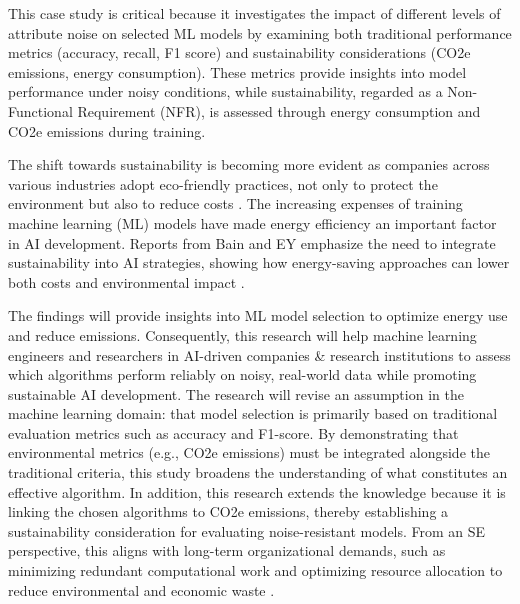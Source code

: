 \documentclass[conference]{IEEEtran}
\begin{document}
This case study is critical because it investigates the impact of different levels of attribute noise on selected ML models by examining both traditional performance metrics (accuracy, recall, F1 score) and sustainability considerations (CO2e emissions, energy consumption). These metrics provide insights into model performance under noisy conditions, while sustainability, regarded as a Non-Functional Requirement (NFR), is assessed through energy consumption and CO2e emissions during training.
\newline
\newline

The shift towards sustainability is becoming more evident as companies across various industries adopt eco-friendly practices, not only to protect the environment but also to reduce costs \cite{ey_ai_sustainability}. The increasing expenses of training machine learning (ML) models have made energy efficiency an important factor in AI development. Reports from Bain and EY emphasize the need to integrate sustainability into AI strategies, showing how energy-saving approaches can lower both costs and environmental impact \cite{bain_ai_sustainability}. 
\newline
\newline

The findings will provide insights into ML model selection to optimize energy use and reduce emissions. Consequently, this research will help machine learning engineers and researchers in AI-driven companies \& research institutions to assess which algorithms perform reliably on noisy, real-world data while promoting sustainable AI development.
\newline
\newline
The research will revise an assumption in the machine learning domain: that model selection is primarily based on traditional evaluation metrics such as accuracy and F1-score. By demonstrating that environmental metrics (e.g., CO2e emissions) must be integrated alongside the traditional criteria, this study broadens the understanding of what constitutes an effective algorithm. In addition, this research extends the knowledge because it is linking the chosen algorithms to CO2e emissions, thereby establishing a sustainability consideration for evaluating noise-resistant models. From an SE perspective, this aligns with long-term organizational demands, such as minimizing redundant computational work and optimizing resource allocation to reduce environmental and economic waste \cite[pp. 290-291]{sweb}.
\end{document}
